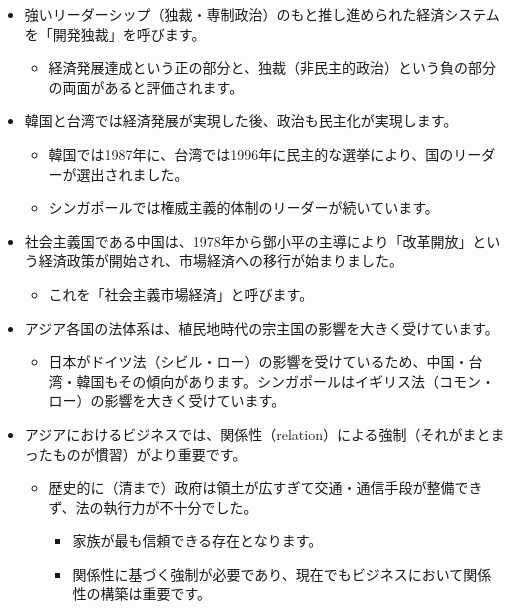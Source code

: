 \documentclass[
]{book}
\providecommand{\tightlist}{%
  \setlength{\itemsep}{0pt}\setlength{\parskip}{0pt}}
\begin{document}
\begin{itemize}
\item
  強いリーダーシップ（独裁・専制政治）のもと推し進められた経済システムを「開発独裁」を呼びます。

  \begin{itemize}
  \tightlist
  \item
    経済発展達成という正の部分と、独裁（非民主的政治）という負の部分の両面があると評価されます。
  \end{itemize}
\item
  韓国と台湾では経済発展が実現した後、政治も民主化が実現します。

  \begin{itemize}
  \item
    韓国では1987年に、台湾では1996年に民主的な選挙により、国のリーダーが選出されました。
  \item
    シンガポールでは権威主義的体制のリーダーが続いています。
  \end{itemize}
\item
  社会主義国である中国は、1978年から鄧小平の主導により「改革開放」という経済政策が開始され、市場経済への移行が始まりました。

  \begin{itemize}
  \tightlist
  \item
    これを「社会主義市場経済」と呼びます。
  \end{itemize}
\item
  アジア各国の法体系は、植民地時代の宗主国の影響を大きく受けています。

  \begin{itemize}
  \tightlist
  \item
    日本がドイツ法（シビル・ロー）の影響を受けているため、中国・台湾・韓国もその傾向があります。シンガポールはイギリス法（コモン・ロー）の影響を大きく受けています。
  \end{itemize}
\item
  アジアにおけるビジネスでは、関係性（relation）による強制（それがまとまったものが慣習）がより重要です。

  \begin{itemize}
  \item
    歴史的に（清まで）政府は領土が広すぎて交通・通信手段が整備できず、法の執行力が不十分でした。

    \begin{itemize}
    \item
      家族が最も信頼できる存在となります。
    \item
      関係性に基づく強制が必要であり、現在でもビジネスにおいて関係性の構築は重要です。
    \end{itemize}
  \end{itemize}
\end{itemize}
\end{document}
